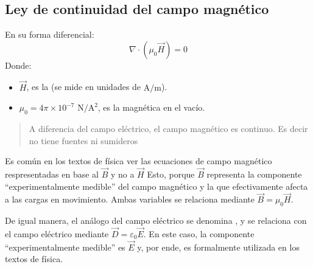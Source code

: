 \documentclass[letterpaper,10pt,english]{jupyterBook}
\begin{document}
\subsection{Ley de continuidad del campo magnético}
\label{\detokenize{1_ondas_electromagneticas/1_ondas_electromagneticas:ley-de-continuidad-del-campo-magnetico}}
\sphinxAtStartPar
{}

\sphinxAtStartPar
En su forma diferencial:
\label{equation:1_ondas_electromagneticas/1_ondas_electromagneticas:da4a15d6-fc0c-4521-b458-5c4b70f5485c}\begin{equation}
\nabla\cdot\left(\mu_0\vec{H}\right) = 0
\end{equation}
\sphinxAtStartPar
Donde:
\begin{itemize}
\item {} 
\sphinxAtStartPar
\(\vec{H}\), es la  (se mide en unidades de \(\mathrm{A/m}\)).

\item {} 
\sphinxAtStartPar
\(\mu_0 = 4\pi\times10^{-7}\) \(\mathrm{N/A^2}\), es la  magnética en el vacío.

\end{itemize}
\begin{quote}

\sphinxAtStartPar
A diferencia del campo eléctrico, el campo magnético es continuo. Es decir no tiene fuentes ni sumideros
\end{quote}

\sphinxAtStartPar
Es común en los textos de física ver las ecuaciones de campo magnético respresentadas en base al  \(\vec{B}\) y no a \(\vec{H}\) Esto, porque \(\vec{B}\) representa la componente “experimentalmente medible” del campo magnético y la que efectivamente afecta a las cargas en movimiento. Ambas variables se relaciona mediante \(\vec{B} =\mu_0\vec{H}\).

\sphinxAtStartPar
De igual manera, el análogo del campo eléctrico se denomina , y se relaciona con el campo eléctrico mediante \(\vec{D}=\varepsilon_0\vec{E}\). En este caso, la componente “experimentalmente medible” es \(\vec{E}\) y, por ende, es formalmente utilizada en los textos de física.
\end{document}
